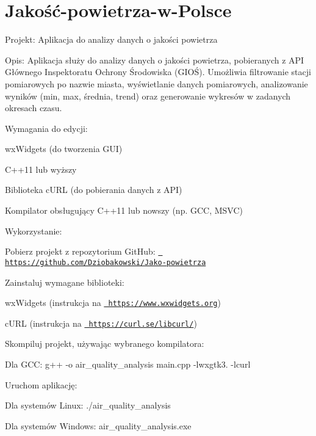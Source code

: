 \chapter{Jakość-\/powietrza-\/w-\/\+Polsce}
\hypertarget{md__r_e_a_d_m_e}{}\label{md__r_e_a_d_m_e}
\label{md__r_e_a_d_m_e_autotoc_md0}%
%


Projekt\+: Aplikacja do analizy danych o jakości powietrza

Opis\+: Aplikacja służy do analizy danych o jakości powietrza, pobieranych z API Głównego Inspektoratu Ochrony Środowiska (GIOŚ). Umożliwia filtrowanie stacji pomiarowych po nazwie miasta, wyświetlanie danych pomiarowych, analizowanie wyników (min, max, średnia, trend) oraz generowanie wykresów w zadanych okresach czasu.

Wymagania do edycji\+:
\begin{DoxyItemize}
\item wx\+Widgets (do tworzenia GUI)
\item C++11 lub wyższy
\item Biblioteka c\+URL (do pobierania danych z API)
\item Kompilator obsługujący C++11 lub nowszy (np. GCC, MSVC)
\end{DoxyItemize}

Wykorzystanie\+:
\begin{DoxyEnumerate}
\item Pobierz projekt z repozytorium Git\+Hub\+: \href{https://github.com/Dziobakowski/Jako-powietrza}{\texttt{ https\+://github.\+com/\+Dziobakowski/\+Jako-\/powietrza}}
\item Zainstaluj wymagane biblioteki\+:
\begin{DoxyItemize}
\item wx\+Widgets (instrukcja na \href{https://www.wxwidgets.org}{\texttt{ https\+://www.\+wxwidgets.\+org}})
\item c\+URL (instrukcja na \href{https://curl.se/libcurl/}{\texttt{ https\+://curl.\+se/libcurl/}})
\end{DoxyItemize}
\item Skompiluj projekt, używając wybranego kompilatora\+:
\begin{DoxyItemize}
\item Dla GCC\+: g++ -\/o air\+\_\+quality\+\_\+analysis main.\+cpp -\/lwxgtk3. -\/lcurl
\end{DoxyItemize}
\item Uruchom aplikację\+:
\begin{DoxyItemize}
\item Dla systemów Linux\+: ./air\+\_\+quality\+\_\+analysis
\item Dla systemów Windows\+: air\+\_\+quality\+\_\+analysis.\+exe
\end{DoxyItemize}
\end{DoxyEnumerate}

